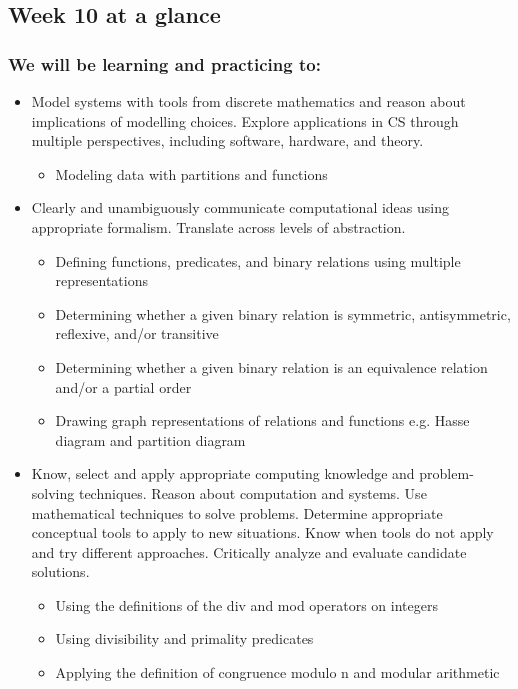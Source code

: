 \documentclass[12pt, oneside]{article}
\begin{document}
\begin{flushright}
\end{flushright} 
\subsection*{Week 10 at a glance}

\subsubsection*{We will be learning and practicing to:}
\begin{itemize}
\item Model systems with tools from discrete mathematics and reason about implications of modelling choices. Explore applications in CS through multiple perspectives, including software, hardware, and theory.
\begin{itemize}
    \item Modeling data with partitions and functions
\end{itemize}

\item Clearly and unambiguously communicate computational ideas using appropriate formalism. Translate across levels of abstraction.
\begin{itemize}
    \item Defining functions, predicates, and binary relations using multiple representations
    \item Determining whether a given binary relation is symmetric, antisymmetric, reflexive, and/or transitive
    \item Determining whether a given binary relation is an equivalence relation and/or a partial order
    \item Drawing graph representations of relations and functions e.g. Hasse diagram and partition diagram
\end{itemize}

\item Know, select and apply appropriate computing knowledge and problem-solving techniques. Reason about computation and systems. Use mathematical techniques to solve problems. Determine appropriate conceptual tools to apply to new situations. Know when tools do not apply and try different approaches. Critically analyze and evaluate candidate solutions.
\begin{itemize}
    \item Using the definitions of the div and mod operators on integers
    \item Using divisibility and primality predicates
    \item Applying the definition of congruence modulo n and modular arithmetic
\end{itemize}


\end{itemize}
\end{document}
